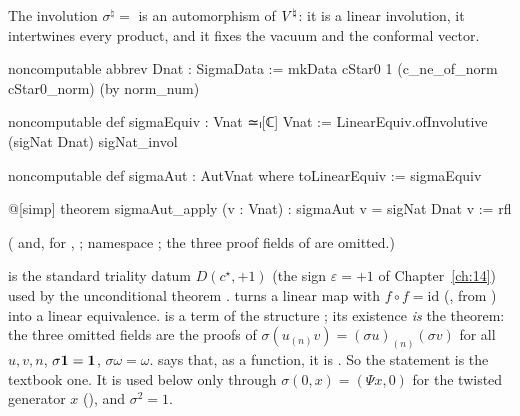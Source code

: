 \begin{theorem}[$\sigma^\natural\in\Aut(\Vnat)$]\label{ch20:thm:sigma}
The involution $\sigma^\natural=$  is an automorphism of ${V^{\natural}}$: it is a linear involution, it
intertwines every product, and it fixes the vacuum and the conformal vector.
\end{theorem}
\begin{leancode}
noncomputable abbrev Dnat : SigmaData :=
  mkData cStar0 1 (c_ne_of_norm cStar0_norm) (by norm_num)

noncomputable def sigmaEquiv : Vnat ≃ₗ[ℂ] Vnat :=
  LinearEquiv.ofInvolutive (sigNat Dnat) sigNat_invol

noncomputable def sigmaAut : AutVnat where
  toLinearEquiv := sigmaEquiv

@[simp] theorem sigmaAut_apply (v : Vnat) : sigmaAut v = sigNat Dnat v := rfl
\end{leancode}
( and, for , ; namespace
; the three proof fields of  are omitted.)
\begin{dictionary}
 is the standard triality datum $D(c^\star,+1)$ (the sign $\varepsilon=+1$ of Chapter~\ref{ch:14}) used by the
unconditional theorem .   turns a linear map with $f\circ f=\mathrm{id}$
(, from ) into a linear equivalence.   is a term of the
structure ; its existence \emph{is} the theorem: the three omitted fields are the proofs of
$\sigma(u_{(n)}v)=(\sigma u)_{(n)}(\sigma v)$ for all $u,v,n$, $\sigma\mathbf 1=\mathbf 1$, $\sigma\omega=\omega$.
 says that, as a function, it is .  So the statement is the textbook one.
It is used below only through $\sigma(0,x)=(\Psi x,0)$ for the twisted generator $x$ (), and
$\sigma^2=1$.
\end{dictionary}
